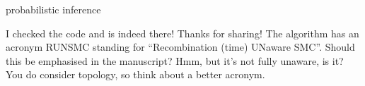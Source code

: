 
\begin{point}{\revref} %
 probabilistic inference
\end{point}


\begin{point}{\revref} %
 I checked the code and is indeed there! Thanks for sharing! The algorithm has an acronym RUNSMC standing for ``Recombination (time) UNaware SMC''. Should this be emphasised in the manuscript? Hmm, but it's not fully unaware, is it? You do consider topology, so think about a better acronym.
\end{point}

\reply{
}



